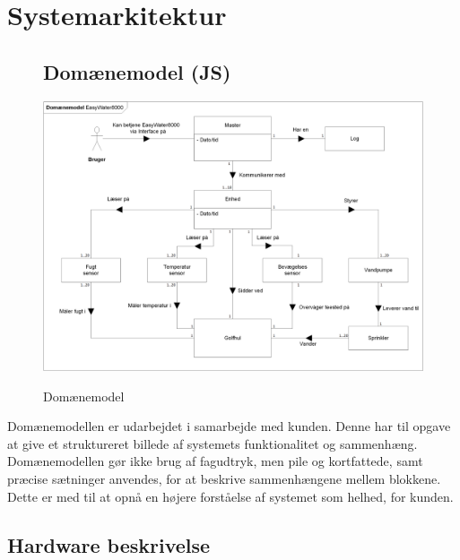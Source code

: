 \chapter{Systemarkitektur}

\begin{figure}[htbp] \centering
\section{Domænemodel (JS)}
{\includegraphics[width=\textwidth]{filer/systemarkitektur/Domainmodel}}
\caption{Domænemodel}
\label{lab:domainmodel}
\end{figure}
Domænemodellen er udarbejdet i samarbejde med kunden. Denne har til opgave at give et struktureret billede af systemets funktionalitet og sammenhæng. Domænemodellen gør ikke brug af fagudtryk, men pile og kortfattede, samt præcise sætninger anvendes, for at beskrive sammenhængene mellem blokkene. Dette er med til at opnå en højere forståelse af systemet som helhed, for kunden.

\newpage
\section{Hardware beskrivelse}


